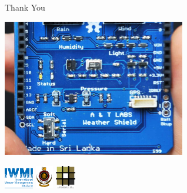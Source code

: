 \documentclass[xcolor=dvipsnames,beamer,unknownkeysallowed]{beamer} %
\begin{document}
\begin{frame}[fragile]{Thank You}

\begin{center}
 \includegraphics[height=6cm]{WeatherShieldSmall}
\end{center}

\begin{flushright}
 \includegraphics[height=0.9cm]{iwmi}
 \hspace{5mm}
 \includegraphics[height=1cm]{uoMoratuwa}
 \hspace{5mm}
 \includegraphics[height=1cm]{uoMoratuwa_foa}
\end{flushright}

\end{frame}
\end{document}
